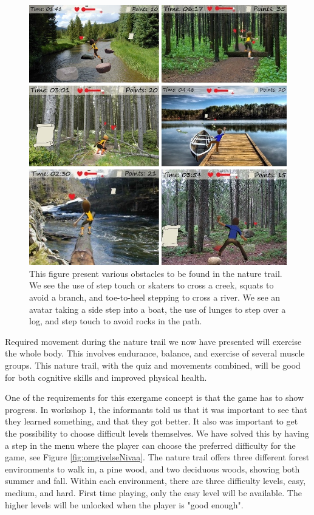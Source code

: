 \begin{figure} [H]
\centering
\includegraphics[scale=0.6]{hindringerEng.jpg}
\caption[Nature trail - obstacles]{This figure present various obstacles to be found in the nature trail. We see the use of step touch or skaters to cross a creek, squats to avoid a branch, and toe-to-heel stepping to cross a river. We see an avatar taking a side step into a boat, the use of lunges to step over a log, and step touch to avoid rocks in the path.}
\label{fig:hindring}
\end{figure}

Required movement during the nature trail we now have presented will exercise the whole body. This involves endurance, balance, and exercise of several muscle groups. This nature trail, with the quiz and movements combined, will be good for both cognitive skills and improved physical health.  

One of the requirements for this exergame concept is that the game has to show progress. In workshop 1, the informants told us that it was important to see that they learned something, and that they got better. It also was important to get the possibility to choose difficult levels themselves. We have solved this by having a step in the menu where the player can choose the preferred difficulty for the game, see Figure \ref{fig:omgivelseNivaa}. The nature trail offers three different forest environments to walk in, a pine wood, and two deciduous woods, showing both summer and fall. Within each environment, there are three difficulty levels, easy, medium, and hard. First time playing, only the easy level will be available. The higher levels will be unlocked when the player is "good enough".   

